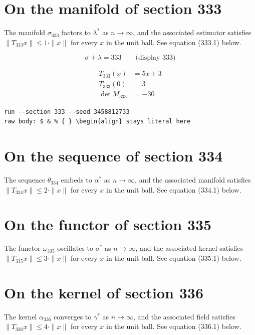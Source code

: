 \documentclass{article}
\begin{document}
\section{On the manifold of section 333}
The manifold $\sigma_{333}$ factors to $\lambda^{*}$ as $n \to \infty$,
and the associated estimator satisfies $\|T_{333} x\| \leq 1 \cdot \|x\|$
for every $x$ in the unit ball. See equation (333.1) below.

$$
\sigma + \lambda = 333 \qquad \text{(display 333)}
$$

\begin{align}
T_{333}(x) &= 5 x + 3 \\
T_{333}(0) &= 3 \\
\det M_{333} &= -30
\end{align}

\begin{verbatim}
run --section 333 --seed 3458812733
raw body: $ & % { } \begin{align} stays literal here
\end{verbatim}

\section{On the sequence of section 334}
The sequence $\theta_{334}$ embeds to $\alpha^{*}$ as $n \to \infty$,
and the associated manifold satisfies $\|T_{334} x\| \leq 2 \cdot \|x\|$
for every $x$ in the unit ball. See equation (334.1) below.

\section{On the functor of section 335}
The functor $\omega_{335}$ oscillates to $\sigma^{*}$ as $n \to \infty$,
and the associated kernel satisfies $\|T_{335} x\| \leq 3 \cdot \|x\|$
for every $x$ in the unit ball. See equation (335.1) below.

\section{On the kernel of section 336}
The kernel $\alpha_{336}$ converges to $\gamma^{*}$ as $n \to \infty$,
and the associated field satisfies $\|T_{336} x\| \leq 4 \cdot \|x\|$
for every $x$ in the unit ball. See equation (336.1) below.
\end{document}
